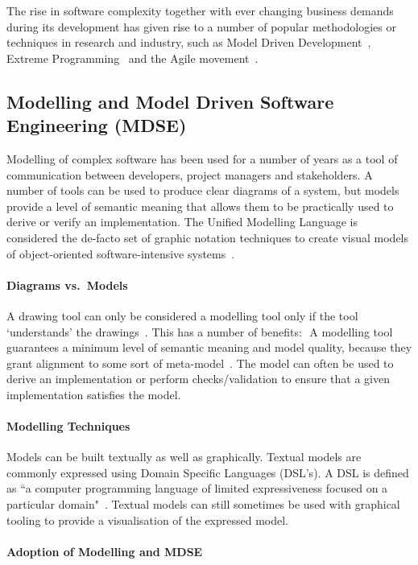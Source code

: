 \documentclass{cshonours}
\begin{document}
The rise in software complexity together with ever changing business demands during its development has given rise to a number of popular methodologies or techniques in research and industry, such as Model Driven Development~\cite{MDD}, Extreme Programming~\cite{BeckXP} and the Agile movement~\cite{AgileManifesto}.

\subsection{Modelling and Model Driven Software Engineering (MDSE)}

Modelling of complex software has been used for a number of years as a tool of communication between developers, project managers and stakeholders. A number of tools can be used to produce clear diagrams of a system, but models provide a level of semantic meaning that allows them to be practically used to derive or verify an implementation. The Unified Modelling Language is considered the de-facto set of graphic notation techniques to create visual models of object-oriented software-intensive systems~\cite{UMLDefinition}.

\paragraph{Diagrams vs.\ Models}
A drawing tool can only be considered a modelling tool only if the tool `understands' the drawings~\cite[p.~11]{ModelDrivenDevelopment}. This has a number of benefits: 
A modelling tool guarantees a minimum level of semantic meaning and model quality, because they grant alignment to some sort of meta-model~\cite[p.~12]{ModelDrivenDevelopment}.
The model can often be used to derive an implementation or perform checks/validation to ensure that a given implementation satisfies the model. 

\paragraph{Modelling Techniques}
Models can be built textually as well as graphically. Textual models are commonly expressed using Domain Specific Languages (DSL’s). A DSL is defined as ``a computer programming language of limited expressiveness focused on a particular domain"~\cite{FowlerDSL}. Textual models can still sometimes be used with graphical tooling to provide a visualisation of the expressed model.

\paragraph{Adoption of Modelling and MDSE}
\end{document}
